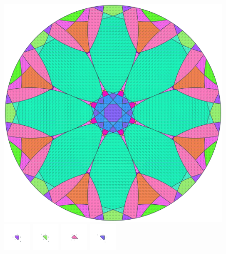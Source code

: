 \documentclass[text.tex]{subfiles}
\begin{document}
\clearpage
\pagestyle{fancy}
\fancyhf{}
\begin{figure}[h!]
\centering
\includegraphics[width=1\textwidth]{img/results/circle8/circle8_223044_(65_-26alpha_1).pdf}
\includegraphics[width=0.12\textwidth]{img/results/circle8/circle8_223044_(65_-26alpha_1)_001.pdf}
\includegraphics[width=0.12\textwidth]{img/results/circle8/circle8_223044_(65_-26alpha_1)_002.pdf}
\includegraphics[width=0.12\textwidth]{img/results/circle8/circle8_223044_(65_-26alpha_1)_003.pdf}
\includegraphics[width=0.12\textwidth]{img/results/circle8/circle8_223044_(65_-26alpha_1)_004.pdf}

\end{figure}
\end{document}
